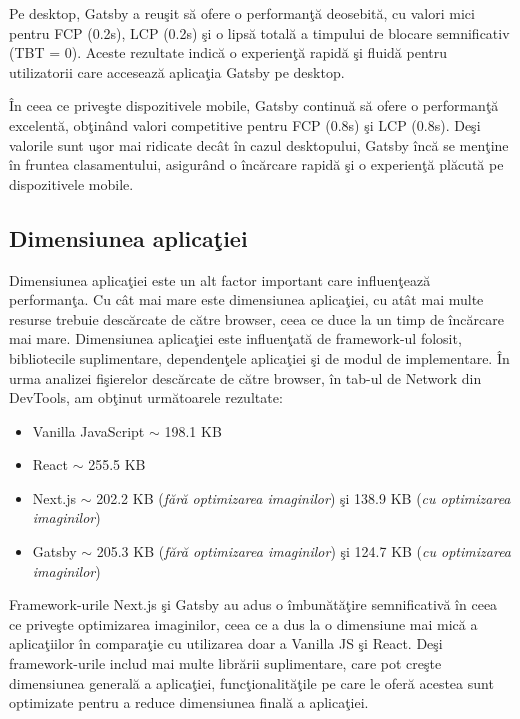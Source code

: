 \documentclass[12pt, a4paper]{report}
\begin{document}
Pe desktop, Gatsby a reu\c sit s\u a ofere o performan\c t\u a deosebit\u a, cu valori mici pentru FCP (0.2s), LCP (0.2s) \c si o lips\u a total\u a a timpului de blocare semnificativ (TBT = 0). Aceste rezultate indic\u a o experien\c t\u a rapid\u a \c si fluid\u a pentru utilizatorii care acceseaz\u a aplica\c tia Gatsby pe desktop.

\^In ceea ce prive\c ste dispozitivele mobile, Gatsby continu\u a s\u a ofere o performan\c t\u a excelent\u a, ob\c tin\^and valori competitive pentru FCP (0.8s) \c si LCP (0.8s). De\c si valorile sunt u\c sor mai ridicate dec\^at \^in cazul desktopului, Gatsby \^inc\u a se men\c tine \^in fruntea clasamentului, asigur\^and o \^inc\u arcare rapid\u a \c si o experien\c t\u a pl\u acut\u a pe dispozitivele mobile.

\subsection{Dimensiunea aplica\c tiei}

Dimensiunea aplica\c tiei este un alt factor important care influen\c teaz\u a performan\c ta. Cu c\^ at mai mare este dimensiunea aplica\c tiei, cu at\^ at mai multe resurse trebuie desc\u arcate de c\u atre browser, ceea ce duce la un timp de \^ inc\u arcare mai mare. Dimensiunea aplica\c tiei este influen\c tat\u a de framework-ul folosit, bibliotecile suplimentare, dependen\c tele aplica\c tiei \c si de modul de implementare.
\^In urma analizei fi\c sierelor desc\u arcate de c\u atre browser, \^in tab-ul de Network din DevTools, am ob\c tinut urm\u atoarele rezultate:

\begin{itemize}
	\item Vanilla JavaScript \(\sim \) 198.1 KB
	\item React \(\sim \) 255.5 KB
	\item Next.js \(\sim \) 202.2 KB (\textit{f\u ar\u a optimizarea imaginilor}) \c si 138.9 KB (\textit{cu optimizarea imaginilor})
	\item Gatsby \(\sim \) 205.3 KB (\textit{f\u ar\u a optimizarea imaginilor}) \c si 124.7 KB (\textit{cu optimizarea imaginilor}) 
\end{itemize}

Framework-urile Next.js \c si Gatsby au adus o \^imbun\u at\u a\c tire semnificativ\u a \^in ceea ce prive\c ste optimizarea imaginilor, ceea ce a dus la o dimensiune mai mic\u a a aplica\c tiilor \^in compara\c tie cu utilizarea doar a Vanilla JS \c si React. De\c si framework-urile includ mai multe libr\u arii suplimentare, care pot cre\c ste dimensiunea general\u a a aplica\c tiei, func\c tionalit\u a\c tile pe care le ofer\u a acestea sunt optimizate pentru a reduce dimensiunea final\u a a aplica\c tiei.
\end{document}
